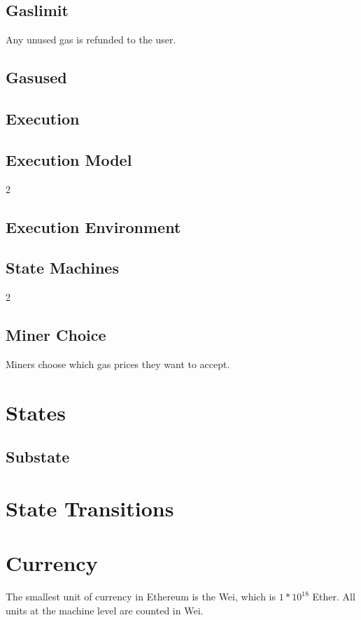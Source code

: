 \documentclass[11pt,a4paper,leqno,bibliography=totoc]{scrartcl}
\newenvironment{alphafootnotes}
    {\par\edef\savedfootnotenumber{\number\value{footnote}}
    \renewcommand{\thefootnote}{\alph{footnote}}
     \setcounter{footnote}{0}}
    {\par\setcounter{footnote}{\savedfootnotenumber}}
\begin{document}
\begin{alphafootnotes}
\begin{multicols}{2}
    \subsection{Gaslimit}
    Any unused gas is refunded to the user.

      \subsection{Gasused}

      \subsection{Execution}

\subsection{Execution Model}
{2}
\subsection{Execution Environment}

\subsection{State Machines}
{2}
    \subsection{Miner Choice}
    Miners choose which gas prices they want to accept.

    \section{States}
    \subsection{Substate}
    \section{State Transitions}

    \section{Currency}
    The smallest unit of currency in Ethereum is the Wei, which is $1*10^18$ Ether. All units at the machine level are counted in Wei.




\end{multicols}
\end{alphafootnotes}
\end{document}
